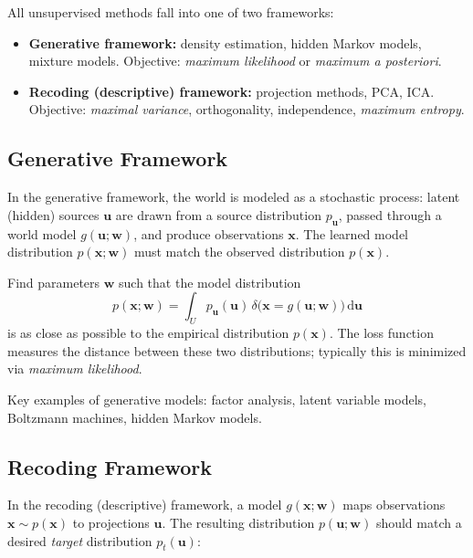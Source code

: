 \documentclass[11pt, oneside]{book}
\newcommand{\dd}{\,\mathrm{d}}
\newcommand{\wvec}{\bm{w}}
\newcommand{\xvec}{\bm{x}}
\newcommand{\uvec}{\bm{u}}
\begin{document}
All unsupervised methods fall into one of two frameworks:

\begin{defbox}[title={Two Frameworks of Unsupervised Learning}]
\begin{itemize}
  \item \textbf{Generative framework:} density estimation, hidden Markov models, mixture
        models. Objective: \emph{maximum likelihood} or \emph{maximum a posteriori}.
  \item \textbf{Recoding (descriptive) framework:} projection methods, PCA, ICA.
        Objective: \emph{maximal variance}, orthogonality, independence, \emph{maximum entropy}.
\end{itemize}
\end{defbox}

\subsection{Generative Framework}

In the generative framework, the world is modeled as a stochastic process:
latent (hidden) sources $\uvec$ are drawn from a source distribution $p_{\uvec}$,
passed through a world model $g(\uvec;\wvec)$, and produce observations $\xvec$.
The learned model distribution $p(\xvec;\wvec)$ must match the observed distribution $p(\xvec)$.

\begin{thmbox}[title={Generative Model Objective}]
Find parameters $\wvec$ such that the model distribution
\[
  p(\xvec;\wvec) = \int_U p_{\uvec}(\uvec)\,\delta\!\bigl(\xvec = g(\uvec;\wvec)\bigr)\dd\uvec
\]
is as close as possible to the empirical distribution $p(\xvec)$.
The loss function measures the distance between these two distributions; typically this
is minimized via \emph{maximum likelihood}.
\end{thmbox}

Key examples of generative models: factor analysis, latent variable models,
Boltzmann machines, hidden Markov models.

\subsection{Recoding Framework}

In the recoding (descriptive) framework, a model $g(\xvec;\wvec)$ maps observations
$\xvec \sim p(\xvec)$ to projections $\uvec$.
The resulting distribution $p(\uvec;\wvec)$ should match a desired \emph{target}
distribution $p_t(\uvec)$:
\end{document}
